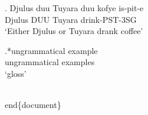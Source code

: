 \documentclass{article}
\begin{document}
\exg. Djulus duu Tuyara duu kofye is-pit-e\\
Djulus DUU Tuyara drink-PST-3SG\\
`Either Djulus or Tuyara drank coffee'

\exg.*ungrammatical example\\
ungrammatical examples\\
`gloss'

\\end\{document\}
\end{document}
